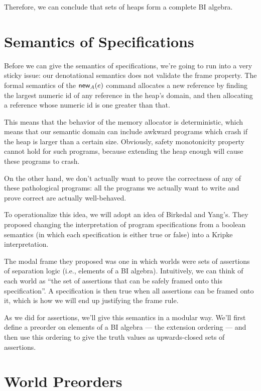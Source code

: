 Therefore, we can conclude that sets of heaps form a complete BI algebra. 

\section{Semantics of Specifications}

Before we can give the semantics of specifications, we're going to run
into a very sticky issue: our denotational semantics does not validate
the frame property. The formal semantics of the $\mathsf{new}_{A}(e)$
command allocates a new reference by finding the largest numeric id of
any reference in the heap's domain, and then allocating a reference
whose numeric id is one greater than that.

This means that the behavior of the memory allocator is deterministic,
which means that our semantic domain can include awkward programs
which crash if the heap is larger than a certain size. Obviously,
safety monotonicity property cannot hold for such programs, because
extending the heap enough will cause these programs to crash.  
 
On the other hand, we don't actually want to prove the correctness of
any of these pathological programs: all the programs we actually want
to write and prove correct are actually well-behaved.

To operationalize this idea, we will adopt an idea of Birkedal and
Yang's. They proposed changing the interpretation of program
specifications from a boolean semantics (in which each specification
is either true or false) into a Kripke interpretation.

The modal frame they proposed was one in which worlds were sets of
assertions of separation logic (i.e., elements of a BI algebra). 
Intuitively, we can think of each world as ``the set of assertions
that can be safely framed onto this specification''. A specification
is then true when all assertions can be framed onto it, which is 
how we will end up justifying the frame rule.

As we did for assertions, we'll give this semantics in a modular
way. We'll first define a preorder on elements of a BI algebra --- the
extension ordering --- and then use this ordering to give the truth
values as upwards-closed sets of assertions.

\section{World Preorders}


